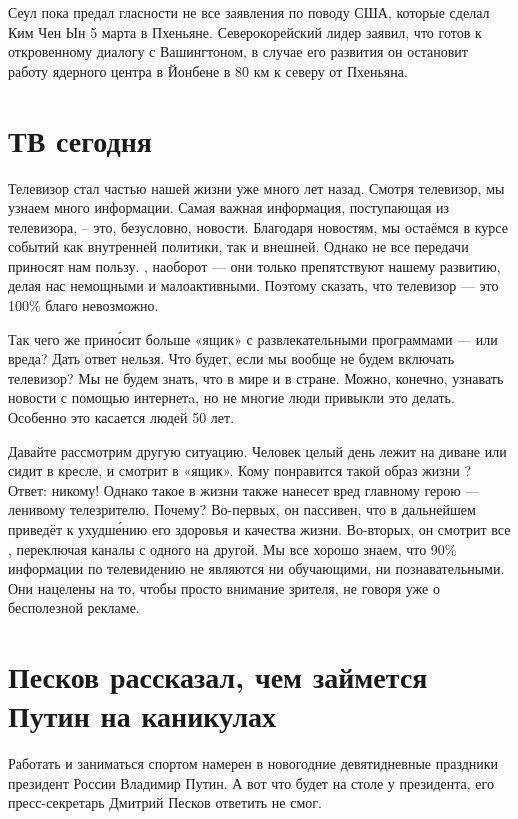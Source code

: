 Сеул пока предал гласности не все заявления по поводу США, которые сделал Ким Чен Ын 5 марта в Пхеньяне. Северокорейский лидер заявил, что готов к откровенному диалогу с Вашингтоном, в случае его развития он остановит работу ядерного центра в Йонбене в 80 км к северу от Пхеньяна.


\section{ТВ сегодня}
Телевизор стал частью нашей жизни уже много лет назад. Смотря телевизор, мы узнаем много информации. Самая важная информация, поступающая из телевизора, -- это, безусловно, новости. Благодаря новостям, мы остаёмся в курсе событий как внутренней политики, так и внешней. Однако не все передачи приносят нам пользу. , наоборот --- они только препятствуют нашему развитию, делая нас немощными и малоактивными. Поэтому сказать, что телевизор --- это 100\% благо невозможно.

Так чего же прин\'{о}сит больше «ящик» с развлекательными программами ---  или вреда? Дать  ответ нельзя. Что будет, если мы вообще не будем включать телевизор? Мы не будем знать, что  в мире и в стране. Можно, конечно, узнавать новости с помощью интернетa, но не многие люди привыкли это делать. Особенно это касается людей  50 лет.

Давайте рассмотрим другую ситуацию. Человек целый день лежит на диване или сидит в кресле, и  смотрит в «ящик». Кому понравится такой образ жизни ? Ответ: никому! Однако такое  в жизни также нанесет вред главному герою --- ленивому телезрителю. Почему? Во-первых, он пассивен, что в дальнейшем приведёт к ухудш\'{е}нию его здоровья и качества жизни. Во-вторых, он смотрит все , переключая каналы с одного на другой. Мы все хорошо знаем, что 90\% информации по телевидению не являются ни обучающими, ни познавательными. Они нацелены на то, чтобы просто  внимание зрителя, не говоря уже о бесполезной рекламе.



\section{Песков рассказал, чем займется Путин на каникулах}
Работать и заниматься спортом намерен в новогодние девятидневные праздники президент России Владимир Путин. А вот что будет на столе у президента, его пресс-секретарь Дмитрий Песков ответить не смог.

